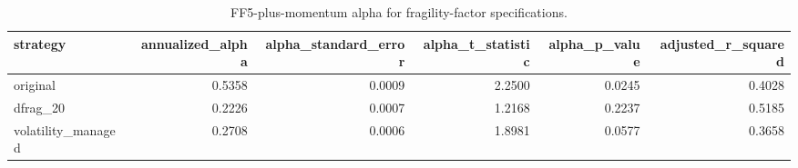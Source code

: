 \begin{table}
\caption{FF5-plus-momentum alpha for fragility-factor specifications.}
\label{tab:long-short-fragility-alpha}
\begin{tabular}{lrrrrr}
\toprule
strategy & annualized_alpha & alpha_standard_error & alpha_t_statistic & alpha_p_value & adjusted_r_squared \\
\midrule
original & 0.5358 & 0.0009 & 2.2500 & 0.0245 & 0.4028 \\
dfrag_20 & 0.2226 & 0.0007 & 1.2168 & 0.2237 & 0.5185 \\
volatility_managed & 0.2708 & 0.0006 & 1.8981 & 0.0577 & 0.3658 \\
\bottomrule
\end{tabular}
\end{table}
